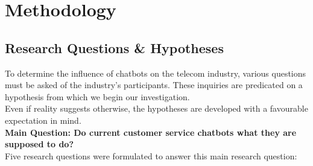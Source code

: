 \mainmatter
\pagestyle{headings}

\chapter{Methodology}
\section{Research Questions \& Hypotheses}
To determine the influence of chatbots on the telecom industry, various questions must be asked of the industry's participants. These inquiries are predicated on a hypothesis from which we begin our investigation.\\
\break
Even if reality suggests otherwise, the hypotheses are developed with a favourable expectation in mind.\\
\break
\textbf{Main Question: Do current customer service chatbots what they are supposed to do?}\\
\break 
Five research questions were formulated to answer this main research question:

